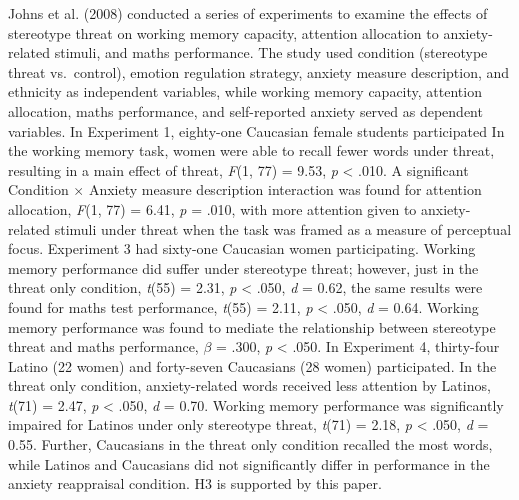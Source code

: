 \documentclass[
  stu, a4paper,floatsintext]{apa7}
\begin{document}
Johns et al. (2008) conducted a series of experiments to examine the effects of stereotype threat on working memory capacity, attention allocation to anxiety-related stimuli, and maths performance.
The study used condition (stereotype threat vs.~control), emotion regulation strategy, anxiety measure description, and ethnicity as independent variables, while working memory capacity, attention allocation, maths performance, and self-reported anxiety served as dependent variables.
In Experiment 1, eighty-one Caucasian female students participated
In the working memory task, women were able to recall fewer words under threat, resulting in a main effect of threat, \emph{F}(1, 77) = 9.53, \emph{p} \textless{} .010.
A significant Condition \(\times\) Anxiety measure description interaction was found for attention allocation, \emph{F}(1, 77) = 6.41, \emph{p} = .010, with more attention given to anxiety-related stimuli under threat when the task was framed as a measure of perceptual focus.
Experiment 3 had sixty-one Caucasian women participating.
Working memory performance did suffer under stereotype threat; however, just in the threat only condition, \emph{t}(55) = 2.31, \emph{p} \textless{} .050, \emph{d} = 0.62, the same results were found for maths test performance, \emph{t}(55) = 2.11, \emph{p} \textless{} .050, \emph{d} = 0.64.
Working memory performance was found to mediate the relationship between stereotype threat and maths performance, \(\beta\) = .300, \emph{p} \textless{} .050.
In Experiment 4, thirty-four Latino (22 women) and forty-seven Caucasians (28 women) participated.
In the threat only condition, anxiety-related words received less attention by Latinos, \emph{t}(71) = 2.47, \emph{p} \textless{} .050, \emph{d} = 0.70.
Working memory performance was significantly impaired for Latinos under only stereotype threat, \emph{t}(71) = 2.18, \emph{p} \textless{} .050, \emph{d} = 0.55.
Further, Caucasians in the threat only condition recalled the most words, while Latinos and Caucasians did not significantly differ in performance in the anxiety reappraisal condition.
H3 is supported by this paper.
\end{document}
